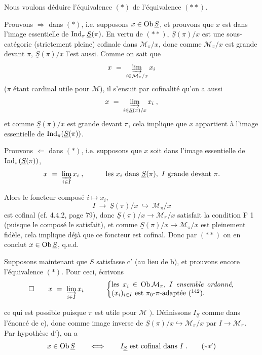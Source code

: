 Nous voulons déduire l'équivalence $(*)$ de l'équivalence $(**)$.

Prouvons $\Longrightarrow$ dans $(*)$, i.e. supposons $x \in \operatorname{Ob}\underline{S}$, et prouvons que $x$ est dans l'image essentielle de $\operatorname{Ind}_\pi\underline{S}(\pi)$. En vertu de $(**)$, $\underline{S}(\pi)/x$ est une sous-catégorie (strictement pleine) cofinale dans $\mathcal{M}_\pi/x$, donc comme $\mathcal{M}_\pi/x$ est grande devant $\pi$, $\underline{S}(\pi)/x$ l'est aussi. Comme on sait que
\[
x \ = \ \varinjlim_{i\in\mathcal{M}_\pi/x} x_i
\]
($\pi$ étant cardinal utile pour $\mathcal{M}$), il s'ensuit par cofinalité qu'on a aussi
\[
x \ = \ \varinjlim_{i\in\underline{S}(\pi)/x} x_i \; ,
\]
et comme $\underline{S}(\pi)/x$ est grande devant $\pi$, cela implique que $x$ appartient à l'image essentielle de $\operatorname{Ind}_\pi(\underline{S}(\pi))$.

Prouvons $\Longleftarrow$ dans $(*)$, i.e. supposons que $x$ soit dans l'image essentielle de $\operatorname{Ind}_\pi(\underline{S}(\pi))$,
\[
x \ = \ \varinjlim_{i\in I} x_i \; , \qquad\quad \text{les } x_i \text{ dans } \underline{S}(\pi),\ I \text{ grande devant } \pi.
\]

Alors le foncteur composé $i \longmapsto x_i$,
\[
I \ \longrightarrow \ \underline{S}(\pi)/x \ \hookrightarrow \ \mathcal{M}_\pi/x
\]
est cofinal (cf. 4.4.2, page 79), donc $\underline{S}(\pi)/x \longrightarrow \mathcal{M}_\pi/x$ satisfait la condition F 1 (puisque le composé le satisfait), et comme $\underline{S}(\pi)/x \longrightarrow \mathcal{M}_\pi/x$ est pleinement fidèle, cela implique déjà que ce foncteur est cofinal. Donc par $(**)$ on en conclut $x \in \operatorname{Ob}\underline{S}$, q.e.d.

Supposons maintenant que $S$ satisfasse c$'$ (au lieu de b), et prouvons encore l'équivalence $(*)$. Pour ceci, écrivons
\[
\square \qquad x \ = \ \varinjlim_{i\in I} x_i \qquad\quad
\left\{
\begin{minipage}[c]{0.5\textwidth}
les $x_i \in \Ob\mathcal{M}_\pi$, $I$ \textit{ensemble ordonné}, $(x_i)_{i\in I}$ est $\pi_0$-$\pi$-adaptée (\footnotemark[142]).
\end{minipage}
\right.
\]

ce qui est possible puisque $\pi$ est utile pour $\mathcal{M}$ $\Bigg)$. Définissons $I_{\underline{S}}$ comme dans l'énoncé de c), donc comme image inverse de $\underline{S}(\pi)/x \hookrightarrow \mathcal{M}_\pi/x$ par $I \longrightarrow \mathcal{M}_\pi$. Par hypothèse d$'$), on a
\[
x \in \operatorname{Ob}\underline{S} \qquad \Longleftrightarrow \qquad I_{\underline{S}} \text{ est cofinal dans } I \; . \tag*{$(**')$}
\]

